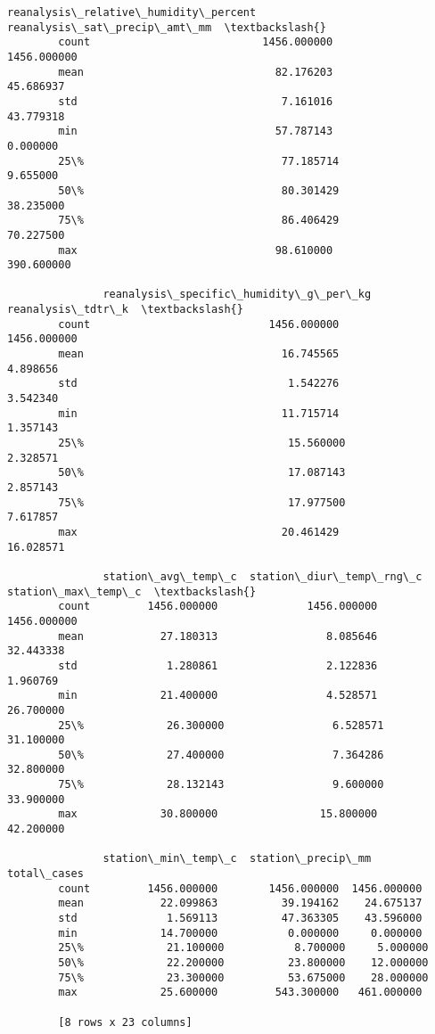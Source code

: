 \documentclass[11pt]{article}
\begin{document}
\begin{Verbatim}[commandchars=\\\{\}]
               reanalysis\_relative\_humidity\_percent  reanalysis\_sat\_precip\_amt\_mm  \textbackslash{}
        count                           1456.000000                   1456.000000   
        mean                              82.176203                     45.686937   
        std                                7.161016                     43.779318   
        min                               57.787143                      0.000000   
        25\%                               77.185714                      9.655000   
        50\%                               80.301429                     38.235000   
        75\%                               86.406429                     70.227500   
        max                               98.610000                    390.600000   
        
               reanalysis\_specific\_humidity\_g\_per\_kg  reanalysis\_tdtr\_k  \textbackslash{}
        count                            1456.000000        1456.000000   
        mean                               16.745565           4.898656   
        std                                 1.542276           3.542340   
        min                                11.715714           1.357143   
        25\%                                15.560000           2.328571   
        50\%                                17.087143           2.857143   
        75\%                                17.977500           7.617857   
        max                                20.461429          16.028571   
        
               station\_avg\_temp\_c  station\_diur\_temp\_rng\_c  station\_max\_temp\_c  \textbackslash{}
        count         1456.000000              1456.000000         1456.000000   
        mean            27.180313                 8.085646           32.443338   
        std              1.280861                 2.122836            1.960769   
        min             21.400000                 4.528571           26.700000   
        25\%             26.300000                 6.528571           31.100000   
        50\%             27.400000                 7.364286           32.800000   
        75\%             28.132143                 9.600000           33.900000   
        max             30.800000                15.800000           42.200000   
        
               station\_min\_temp\_c  station\_precip\_mm  total\_cases  
        count         1456.000000        1456.000000  1456.000000  
        mean            22.099863          39.194162    24.675137  
        std              1.569113          47.363305    43.596000  
        min             14.700000           0.000000     0.000000  
        25\%             21.100000           8.700000     5.000000  
        50\%             22.200000          23.800000    12.000000  
        75\%             23.300000          53.675000    28.000000  
        max             25.600000         543.300000   461.000000  
        
        [8 rows x 23 columns]
\end{Verbatim}
            
\end{document}
